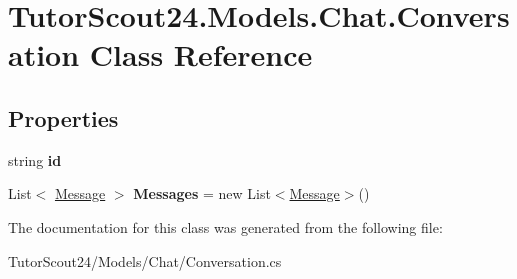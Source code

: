 \hypertarget{class_tutor_scout24_1_1_models_1_1_chat_1_1_conversation}{}\section{Tutor\+Scout24.\+Models.\+Chat.\+Conversation Class Reference}
\label{class_tutor_scout24_1_1_models_1_1_chat_1_1_conversation}
\subsection*{Properties}
\begin{DoxyCompactItemize}
\item 
\mbox{\label{class_tutor_scout24_1_1_models_1_1_chat_1_1_conversation_aa890610d71a11fbc23fddac4f4a49d4a}} 
string {\bfseries id}
\item 
\mbox{\label{class_tutor_scout24_1_1_models_1_1_chat_1_1_conversation_a883620d07834b0b7de78e6f3b51f009c}} 
List$<$ \mbox{\hyperlink{class_tutor_scout24_1_1_models_1_1_chat_1_1_message}{Message}} $>$ {\bfseries Messages} = new List$<$\mbox{\hyperlink{class_tutor_scout24_1_1_models_1_1_chat_1_1_message}{Message}}$>$()
\end{DoxyCompactItemize}


The documentation for this class was generated from the following file\+:\begin{DoxyCompactItemize}
\item 
Tutor\+Scout24/\+Models/\+Chat/Conversation.\+cs\end{DoxyCompactItemize}
